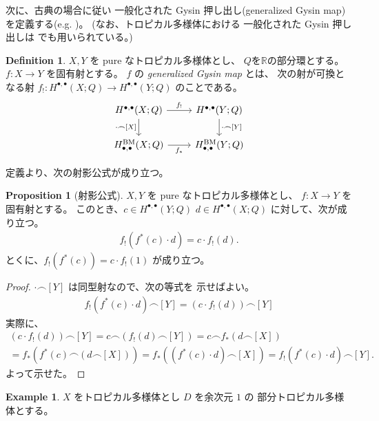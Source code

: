 \documentclass[a4paper,dvipdfmx,reqno,12pt]{amsart}
\theoremstyle{definition}
\newtheorem{definition}[theorem]{Definition}
\newtheorem{example}[theorem]{Example}
\newtheorem{proposition}[theorem]{Proposition}
\numberwithin{equation}{section}
\begin{document}
次に、古典の場合に従い
一般化された Gysin 押し出し(generalized Gysin map)
を定義する(e.g. 
\cite[Chapter 13. Appendix]{MR2810322})。
(なお、トロピカル多様体における
一般化された Gysin 押し出しは
\cite[Proposition 8.3]{} でも用いられている。)
\begin{definition}
$X,Y$ を pure なトロピカル多様体とし、
$Q$を$\mathbb{R}$の部分環とする。
$f\colon X\to Y$ を固有射とする。
$f$ の \emph{generalized Gysin map} とは、
次の射が可換となる射
$f_!\colon H^{\bullet,\bullet}(X;Q)\to 
H^{\bullet,\bullet}(Y;Q)$
のことである。
\begin{equation}
\begin{tikzcd}
	{H^{\bullet,\bullet}(X;Q)} & {H^{\bullet,\bullet}(Y;Q)} \\
	{H_{\bullet,\bullet}^{\mathrm{BM}}(X;Q)} & {H_{\bullet,\bullet}^{\mathrm{BM}}(Y;Q)}
	\arrow["{\cdot \frown [X]}"', from=1-1, to=2-1]
	\arrow["{\cdot\frown[Y]}", from=1-2, to=2-2]
	\arrow["{f_*}"', from=2-1, to=2-2]
	\arrow["{f_!}", from=1-1, to=1-2]
\end{tikzcd}    
\end{equation}

\end{definition}
定義より、次の射影公式が成り立つ。
\begin{proposition}[{射影公式}]
$X,Y$ を pure なトロピカル多様体とし、
$f\colon X\to Y$ を固有射とする。
このとき、$c\in H^{\bullet,\bullet}(Y;Q) $
$d\in H^{\bullet,\bullet}(X;Q)$
に対して、次が成り立つ。
\begin{align}
    f_!(f^{*}(c)\cdot d)=c\cdot f_!(d).
\end{align}
とくに、$f_!(f^{*}(c))=c\cdot f_!(1)$ が成り立つ。
\end{proposition}

\begin{proof}
$\cdot \frown [Y]$ は同型射なので、次の等式を
示せばよい。
\begin{align}
    f_!(f^{*}(c)\cdot d)\frown [Y]=(c\cdot f_!(d))\frown [Y]
\end{align}
実際に、
\begin{align}
(c\cdot f_!(d))\frown [Y]=
c\frown(f_!(d)\frown [Y])=
c\frown f_*(d\frown [X])\\
=f_*(f^*(c)\frown (d\frown [X]))=
f_*((f^*(c)\cdot d) \frown [X])
=f_!(f^{*}(c)\cdot d)\frown [Y].
\end{align}
よって示せた。
\end{proof}

\begin{example}
$X$ をトロピカル多様体とし $D$ を余次元 $1$ の
部分トロピカル多様体とする。
\end{example}
\end{document}
